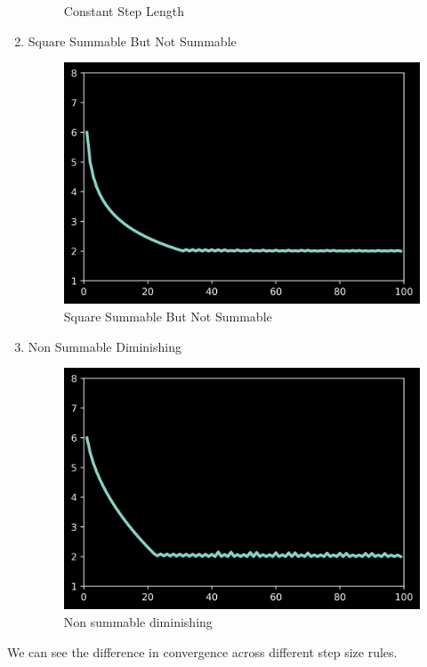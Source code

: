 \documentclass[twoside,twocolumn]{article}
\begin{document}
\begin{enumerate}
\begin{figure}[H]
        \caption{Constant Step Length}
        \label{constantsteplength}
    \end{figure}
    \item Square Summable But Not Summable
    \begin{figure}[H]
        \centering
        \includegraphics[scale=0.5]{../../step/squaresummablebutnotsummable.png}
        \caption{Square Summable But Not Summable}
        \label{squaresummablebutnotsummable}
    \end{figure}
    \item Non Summable Diminishing
    \begin{figure}[H]
        \centering
        \includegraphics[scale=0.5]{../../step/nonsummablediminishing.png}
        \caption{Non summable diminishing}
        \label{nonsummablediminishing}
    \end{figure}
\end{enumerate}
We can see the difference in convergence across different step size rules.
\end{document}
